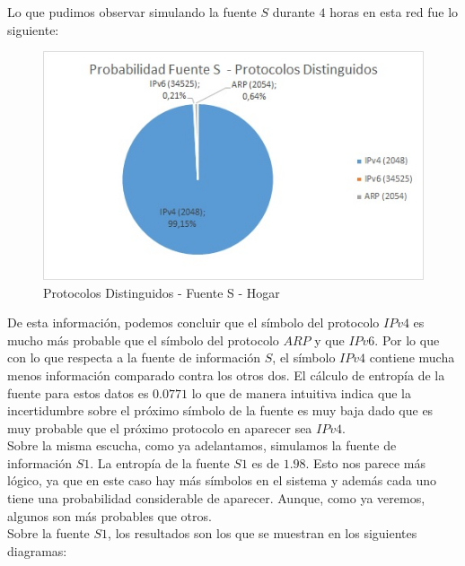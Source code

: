 Lo que pudimos observar simulando la fuente $S$ durante $4$ horas en esta red fue lo siguiente:\\
%

\newpage
\begin{figure}[h!]
\centering
\includegraphics[scale=0.9]{./img/probaS_casa.jpg}
\caption{Protocolos Distinguidos - Fuente S - Hogar}
\end{figure}

De esta información, podemos concluir que el símbolo del protocolo $IPv4$ es mucho más probable que el símbolo del protocolo $ARP$ y que $IPv6$. 
Por lo que con lo que respecta a la fuente de información $S$, el símbolo $IPv4$ contiene mucha menos información comparado contra los otros dos. 
El cálculo de entropía de la fuente para estos datos es $0.0771$ lo que de manera intuitiva indica que la incertidumbre sobre el próximo símbolo 
de la fuente es muy baja dado que es muy probable que el próximo protocolo en aparecer sea $IPv4$.\\

Sobre la misma escucha, como ya adelantamos, simulamos la fuente de información $S1$. 
La entropía de la fuente $S1$ es de $1.98$. Esto nos parece más lógico, ya que en este caso hay más símbolos en el sistema y 
además cada uno tiene una probabilidad considerable de aparecer. Aunque, como ya veremos, algunos son más probables que otros.\\

Sobre la fuente $S1$, los resultados son los que se muestran en los siguientes diagramas:

